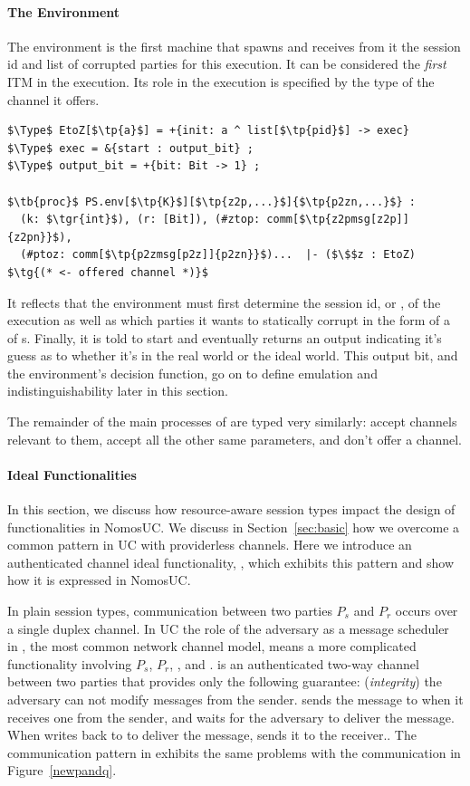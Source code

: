\paragraph*{\textbf{The Environment}}
The environment is the first machine that  spawns and receives from it the session id and list of corrupted parties for this execution. 
It can be considered the \emph{first} ITM in the execution.
Its role in the execution is specified by the type  of the channel it offers.
\begin{lstlisting}[basicstyle=\scriptsize\BeraMonottFamily, mathescape, frame=single]
$\Type$ EtoZ[$\tp{a}$] = +{init: a ^ list[$\tp{pid}$] -> exec} 
$\Type$ exec = &{start : output_bit} ;
$\Type$ output_bit = +{bit: Bit -> 1} ;

$\tb{proc}$ PS.env[$\tp{K}$][$\tp{z2p,...}$]{$\tp{p2zn,...}$} : 
  (k: $\tgr{int}$), (r: [Bit]), (#ztop: comm[$\tp{z2pmsg[z2p]]{z2pn}}$), 
  (#ptoz: comm[$\tp{p2zmsg[p2z]]{p2zn}}$)...  |- ($\$$z : EtoZ) $\tg{(* <- offered channel *)}$
\end{lstlisting}
It reflects that the environment must first determine the session id, or , of the execution as well as which parties it wants to statically corrupt in the form of a  of s.
Finally, it is told to start and eventually returns an output  indicating it's guess as to whether it's in the real world or the ideal world.
This output bit, and the environment's decision function, go on to define emulation and indistinguishability later in this section. 

The remainder of the main processes of  are typed very similarly: accept channels relevant to them, accept all the other same parameters, and don't offer a channel.

\paragraph*{\textbf{Ideal Functionalities}}
In this section, we discuss how resource-aware session types impact the design of functionalities in NomosUC.
We discuss in Section~\ref{sec:basic} how we overcome a common pattern in UC with providerless channels.
Here we introduce an authenticated channel ideal functionality, \Fauth, which exhibits this pattern and show
how it is expressed in NomosUC.

In plain session types, communication between two parties $P_s$ and $P_r$ occurs over a single duplex channel.
In UC the role of the adversary as a message scheduler in \Fauth, the most common network channel model, means a more complicated functionality involving $P_s$, $P_r$, \F, and \A. 
\Fauth is an authenticated two-way channel between two parties that provides only the following guarantee: (\emph{integrity}) the adversary can not modify messages from the sender.
\Fauth sends the message to \A when it receives one from the sender, and waits for the adversary to deliver the message.
When \A writes back to \Fauth to deliver the message, \Fauth sends it to the receiver..
The communication pattern in \Fauth exhibits the same problems with the communication in Figure~\ref{newpandq}.

